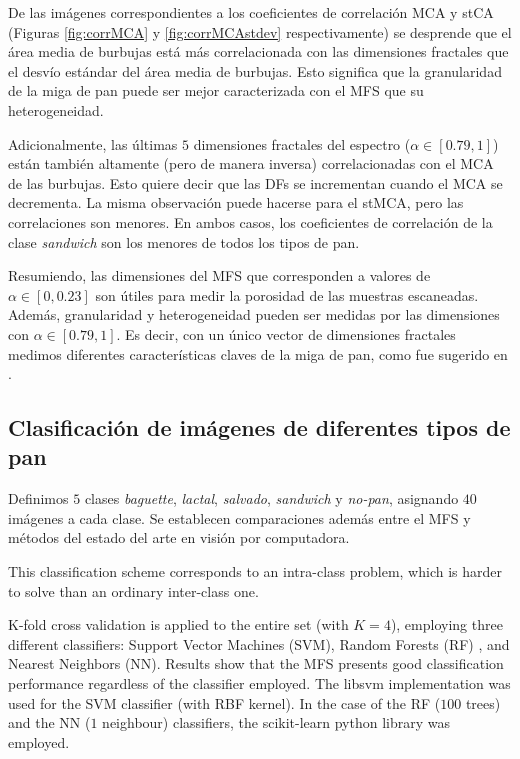 \documentclass[spanish,a4paper,11pt,oneside,links]{report}
\begin{document}
De las imágenes correspondientes a los coeficientes de correlación MCA y stCA (Figuras \ref{fig:corrMCA} y \ref{fig:corrMCAstdev} respectivamente) se desprende que el área media de burbujas está más correlacionada con las dimensiones fractales que el desvío estándar del área media de burbujas. Esto significa que la granularidad de la miga de pan puede ser mejor caracterizada con el MFS que su heterogeneidad.

Adicionalmente, las últimas $5$ dimensiones fractales  del espectro ($\alpha \in [0.79,1]$) están también altamente (pero de manera inversa) correlacionadas con el MCA de las burbujas. Esto quiere decir que las DFs se incrementan cuando el MCA se decrementa. La misma observación puede hacerse para el stMCA, pero las correlaciones son menores. En ambos casos, los coeficientes de correlación de la clase {\em sandwich} son los menores de todos los tipos de pan.

Resumiendo, las dimensiones del MFS que corresponden a valores de  $\alpha \in [0,0.23]$ son útiles para medir la porosidad de las muestras escaneadas. Además, granularidad y heterogeneidad pueden ser medidas por las dimensiones con  $\alpha \in [0.79,1]$. Es decir, con un único vector de dimensiones fractales medimos diferentes características claves de la miga de pan, como fue sugerido en \cite{Gonzales2008}.

\subsection{Clasificaci\'on de imágenes de diferentes tipos de pan}

Definimos $5$ clases {\em baguette}, {\em lactal}, {\em salvado}, {\em sandwich} y {\em no-pan}, asignando $40$ imágenes a cada clase.  Se establecen comparaciones además entre el MFS y métodos del estado del arte en visión por computadora.

This classification scheme corresponds to an intra-class problem, which is harder to solve than an ordinary inter-class one. 

K-fold cross validation is applied to the entire set (with $K=4$), employing three different classifiers: Support Vector Machines (SVM), Random Forests (RF) \cite{Breiman2001}, and Nearest Neighbors (NN). Results show that the MFS presents good classification performance regardless of the classifier employed. The \textsf{libsvm} implementation \cite{Chang2011} was used for the SVM classifier (with RBF kernel). In the case of the RF ($100$ trees) and the NN ($1$ neighbour) classifiers, the \textsf{scikit-learn} python library was employed.
\end{document}

